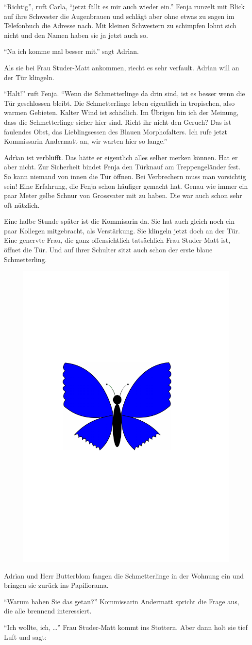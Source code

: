 \enquote{Richtig}, ruft Carla, \enquote{jetzt fällt es mir auch wieder ein.} Fenja runzelt mit Blick auf ihre Schwester die Augenbrauen und schlägt aber ohne etwas zu sagen im Telefonbuch die Adresse nach. Mit kleinen Schwestern zu schimpfen lohnt sich nicht und den Namen haben sie ja jetzt auch so.

\enquote{Na ich komme mal besser mit.} sagt Adrìan.

Als sie bei Frau Studer-Matt ankommen, riecht es sehr verfault. Adrìan will an der Tür klingeln.

\enquote{Halt!} ruft Fenja. \enquote{Wenn die Schmetterlinge da drin sind, ist es besser wenn die Tür geschlossen bleibt. Die Schmetterlinge leben eigentlich in tropischen, also warmen Gebieten. Kalter Wind ist schädlich. Im Übrigen bin ich der Meinung, dass die Schmetterlinge sicher hier sind. Richt ihr nicht den Geruch? Das ist faulendes Obst, das Lieblingsessen des Blauen Morphofalters. Ich rufe jetzt Kommissarin Andermatt an, wir warten hier so lange.}

Adrìan ist verblüfft. Das hätte er eigentlich alles selber merken können. Hat er aber nicht. Zur Sicherheit bindet Fenja den Türknauf am Treppengeländer fest. So kann niemand von innen die Tür öffnen. Bei Verbrechern muss man vorsichtig sein! Eine Erfahrung, die Fenja schon häufiger gemacht hat. Genau wie immer ein paar Meter gelbe Schnur von Grossvater mit zu haben. Die war auch schon sehr oft nützlich. 

Eine halbe Stunde später ist die Kommisarin da. Sie hat auch gleich noch ein paar Kollegen mitgebracht, als Verstärkung. Sie klingeln jetzt doch an der Tür. Eine genervte Frau, die ganz offensichtlich tatsächlich Frau Studer-Matt ist, öffnet die Tür. Und auf ihrer Schulter sitzt auch schon der erste blaue Schmetterling.
\begin{figure}[H]
\centering
\includegraphics[width=.05\textwidth]{bilder/inkling.pdf}
\end{figure}
Adrìan und Herr Butterblom fangen die Schmetterlinge in der Wohnung ein und bringen sie zurück ins Papiliorama. 

\enquote{Warum haben Sie das getan?} Kommissarin Andermatt spricht die Frage aus, die alle brennend interessiert.

\enquote{Ich wollte, ich, \dots} Frau Studer-Matt kommt ins Stottern. Aber dann holt sie tief Luft und sagt: 

